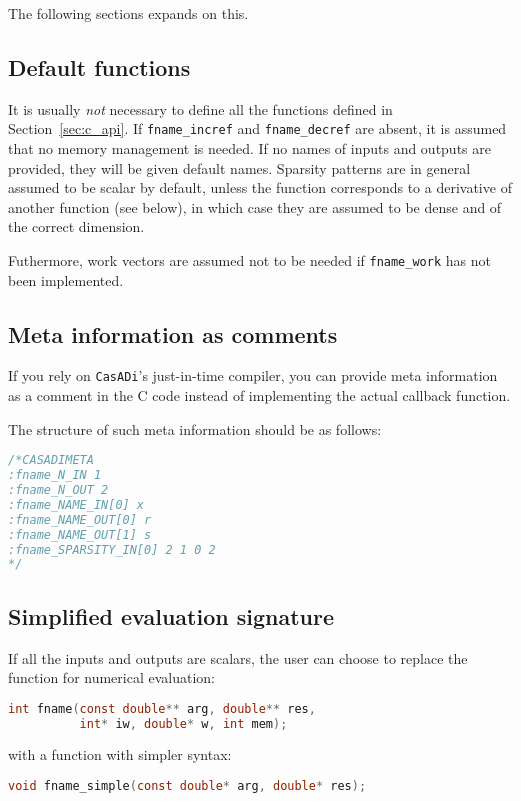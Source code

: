 \documentclass[a4paper,12pt]{book}
\newcommand{\CasADi}{\texttt{CasADi}\xspace}
\begin{document}
The following sections expands on this.

\subsection*{Default functions}
It is usually \emph{not} necessary to define all the functions defined in
Section~\ref{sec:c_api}. If \verb|fname_incref| and \verb|fname_decref|
are absent, it is assumed that no memory management is needed. If no
names of inputs and outputs are provided, they will be given default names.
Sparsity patterns are in general assumed to be scalar by default, unless the
function corresponds to a derivative of another function (see below), in which
case they are assumed to be dense and of the correct dimension.

Futhermore, work vectors are assumed not to be needed if \verb|fname_work| has
not been implemented.

\subsection*{Meta information as comments}
If you rely on \CasADi's just-in-time compiler, you can provide meta information
as a comment in the C code instead of implementing the actual callback function.

The structure of such meta information should be as follows:
\begin{lstlisting}[language=C]
/*CASADIMETA
:fname_N_IN 1
:fname_N_OUT 2
:fname_NAME_IN[0] x
:fname_NAME_OUT[0] r
:fname_NAME_OUT[1] s
:fname_SPARSITY_IN[0] 2 1 0 2
*/
\end{lstlisting}

\subsection*{Simplified evaluation signature}
If all the inputs and outputs are scalars, the user can choose to replace the
function for numerical evaluation:

\begin{lstlisting}[language=C]
int fname(const double** arg, double** res,
          int* iw, double* w, int mem);
\end{lstlisting}

with a function with simpler syntax:
\begin{lstlisting}[language=C]
void fname_simple(const double* arg, double* res);
\end{lstlisting}
\end{document}
